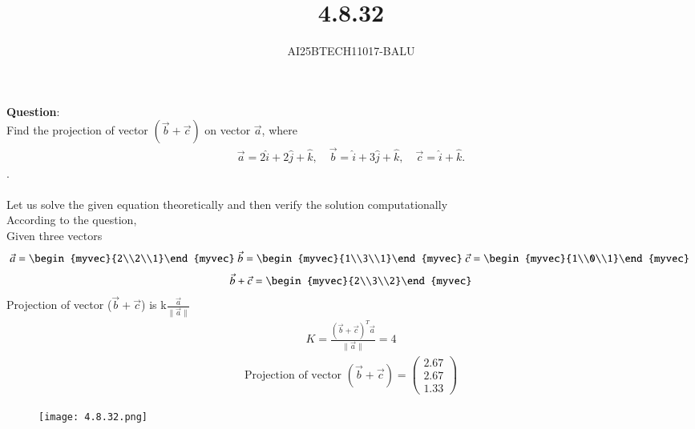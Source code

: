 \documentclass[journal]{IEEEtran}
\begin{document}

\vspace{3cm}

\title{4.8.32}
\author{AI25BTECH11017-BALU}
 \maketitle
{\let\newpage\relax\maketitle}
\renewcommand{\thefigure}{\theenumi}
\renewcommand{\thetable}{\theenumi}
\setlength{\intextsep}{10pt} %
\renewcommand{\thetable}{\theenumi}
\textbf{Question}:\\
 Find the projection of vector $(\vec{b}+\vec{c})$ on vector $\vec{a}$, where 
\begin{align}
\vec{a} = 2\hat{i} + 2\hat{j} + \hat{k}, \quad 
\vec{b} = \hat{i} + 3\hat{j} + \hat{k}, \quad 
\vec{c} = \hat{i} + \hat{k}.
\end{align}.\\
\solution \\
Let us solve the given equation theoretically and then verify the solution computationally \\
According to the question, \\
Given three vectors\\
\begin{align}
\vec{a}=\begin{myvec}{2\\2\\1}\end{myvec}\
\vec{b}=\begin{myvec}{1\\3\\1}\end{myvec}\
\vec{c}=\begin{myvec}{1\\0\\1}\end{myvec}\
\end{align}
   \begin{align}
 \vec{b}+\vec{c}=\begin{myvec}{2\\3\\2}\end{myvec}
\end{align}
Projection of vector ($\vec{b}+\vec{c}$) is k$\frac{\vec{a}}{\|\vec{a}\|}$
\begin{align}
    K=\frac{(\vec{b}+\vec{c})^T\vec{a}}{\|\vec{a}\|}=4
\end{align}
\begin{align}
\text{Projection of vector } (\vec{b}+\vec{c}) = 
\begin{pmatrix}
2.67 \\
2.67 \\
1.33
\end{pmatrix}
\end{align}
\begin{figure}[h!]
    \centering
    \texttt{[image: 4.8.32.png]}
    \label{figure_1}
\end{figure}
 
\end{document}
